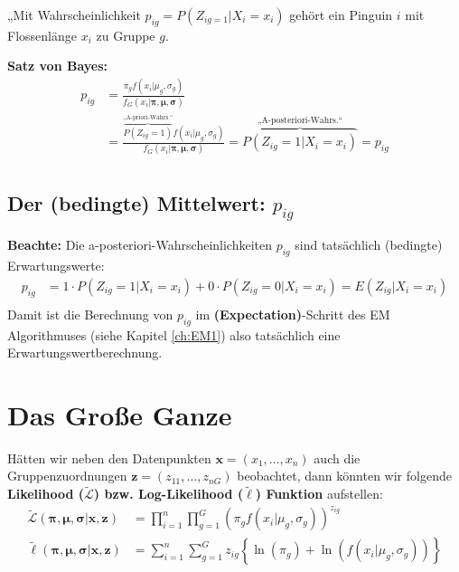 \documentclass[
  ngerman,
]{book}
\begin{document}
„Mit Wahrscheinlichkeit \(p_{ig}=P(Z_{ig=1}|X_i=x_i)\) gehört ein Pinguin \(i\) mit Flossenlänge \(x_i\) zu Gruppe \(g\).

\textbf{Satz von Bayes:}
\begin{align*}
p_{ig}
&=\frac{\pi_gf(x_i|\mu_g,\sigma_g)}{f_G(x_i|\boldsymbol{\pi},\boldsymbol{\mu},\boldsymbol{\sigma})}\\[2ex]
&=\frac{\overbrace{P(Z_{ig}=1)}^{\text{„A-priori-Wahrs.“}}f(x_i|\mu_g,\sigma_g)}{f_G(x_i|\boldsymbol{\pi},\boldsymbol{\mu},\boldsymbol{\sigma})}=\overbrace{P(Z_{ig}=1|X_i=x_i)}^{\text{„A-posteriori-Wahrs.“}}=p_{ig}\\
\end{align*}

\hypertarget{der-bedingte-mittelwert-p_ig}{%
\subsection{\texorpdfstring{Der (bedingte) Mittelwert: \(p_{ig}\)}{Der (bedingte) Mittelwert: p\_\{ig\}}}\label{der-bedingte-mittelwert-p_ig}}

\textbf{Beachte:} Die a-posteriori-Wahrscheinlichkeiten \(p_{ig}\) sind tatsächlich (bedingte) Erwartungswerte:
\begin{align*}
p_{ig}&= 1\cdot P(Z_{ig}=1|X_i=x_i)+0\cdot P(Z_{ig}=0|X_i=x_i) = E(Z_{ig}|X_i=x_i)\\
\end{align*}
Damit ist die Berechnung von \(p_{ig}\) im \textbf{(Expectation)}-Schritt des EM Algorithmuses (siehe Kapitel \ref{ch:EM1}) also tatsächlich eine Erwartungswertberechnung.

\hypertarget{das-grouxdfe-ganze}{%
\section{Das Große Ganze}\label{das-grouxdfe-ganze}}

Hätten wir neben den Datenpunkten \(\mathbf{x}=(x_1,\dots,x_n)\) auch die Gruppenzuordnungen \(\mathbf{z}=(z_{11},\dots,z_{nG})\) beobachtet, dann könnten wir folgende \textbf{Likelihood (\(\tilde{\mathcal{L}}\)) bzw. Log-Likelihood (\(\tilde{\ell}\)) Funktion} aufstellen:
\begin{align*}
\tilde{\mathcal{L}}(\boldsymbol{\pi},\boldsymbol{\mu},\boldsymbol{\sigma}|\mathbf{x},\mathbf{z})
&=\prod_{i=1}^n\prod_{g=1}^G\left(\pi_gf(x_i|\mu_g,\sigma_g)\right)^{z_{ig}}\\[2ex]
\tilde{\ell}(\boldsymbol{\pi},\boldsymbol{\mu},\boldsymbol{\sigma}|\mathbf{x},\mathbf{z})
&=\sum_{i=1}^n\sum_{g=1}^Gz_{ig}\left\{\ln\left(\pi_g\right)+\ln\left(f(x_i|\mu_g,\sigma_g)\right)\right\}
\end{align*}
\end{document}
